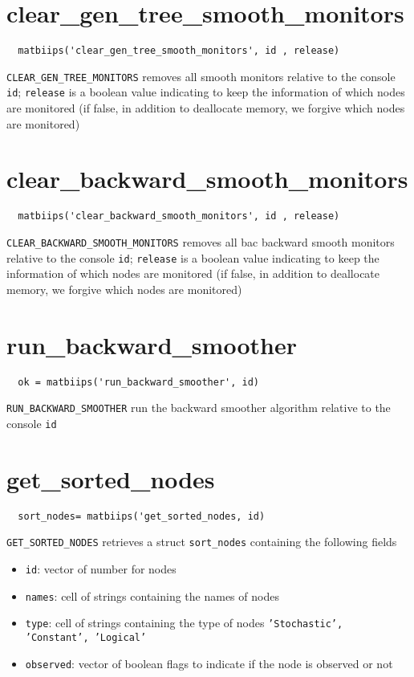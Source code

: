 \documentclass[11pt,twoside]{article}
\begin{document}
\section{clear\_gen\_tree\_smooth\_monitors}

 \begin{lstlisting}
  matbiips('clear_gen_tree_smooth_monitors', id , release)
 \end{lstlisting}

  \texttt{CLEAR\_GEN\_TREE\_MONITORS} removes all smooth monitors relative to the console \texttt{id};
  \texttt{release} is a  boolean value indicating to keep the information of which nodes are monitored (if false, in addition to deallocate memory,
  we forgive which nodes are monitored)

\section{clear\_backward\_smooth\_monitors}

 \begin{lstlisting}
  matbiips('clear_backward_smooth_monitors', id , release)
 \end{lstlisting}

  \texttt{CLEAR\_BACKWARD\_SMOOTH\_MONITORS} removes all bac backward smooth monitors relative to the console \texttt{id};
  \texttt{release} is a boolean value indicating to keep the information of which nodes are monitored (if false, in addition to deallocate memory,
  we forgive which nodes are monitored)

\section{run\_backward\_smoother}


 \begin{lstlisting}
  ok = matbiips('run_backward_smoother', id)
 \end{lstlisting}

  \texttt{RUN\_BACKWARD\_SMOOTHER} run the backward smoother algorithm relative to the console \texttt{id}


\section{get\_sorted\_nodes}


 \begin{lstlisting}
  sort_nodes= matbiips('get_sorted_nodes, id)
 \end{lstlisting}
  \texttt{GET\_SORTED\_NODES} retrieves a struct \texttt{sort\_nodes} containing the following fields
  \begin{itemize}
   \item \texttt{id}: vector of number for nodes
   \item \texttt{names}: cell of strings containing the names of nodes
   \item \texttt{type}: cell of strings containing the type of nodes \texttt{'Stochastic', 'Constant', 'Logical'}
   \item \texttt{observed}: vector of boolean flags to indicate if the node is observed or not
   \end{itemize}
\end{document}
